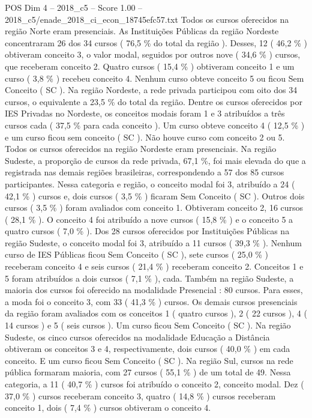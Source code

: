 \begin{textsample}{POS Dim 4 – 2018\_c5 – Score 1.00 – 2018\_c5/enade\_2018\_ci\_econ\_18745efc57.txt}
Todos os cursos oferecidos na região Norte eram presenciais.
As Instituições Públicas da região Nordeste concentraram 26 dos 34 cursos ( 76,5 \% do total da região ).
Desses, 12 ( 46,2 \% ) obtiveram conceito 3, o valor modal, seguidos por outros nove ( 34,6 \% ) cursos, que receberam conceito 2.
Quatro cursos ( 15,4 \% ) obtiveram conceito 1 e um curso ( 3,8 \% ) recebeu conceito 4.
Nenhum curso obteve conceito 5 ou ficou Sem Conceito ( SC ).
Na região Nordeste, a rede privada participou com oito dos 34 cursos, o equivalente a 23,5 \% do total da região.
Dentre os cursos oferecidos por IES Privadas no Nordeste, os conceitos modais foram 1 e 3 atribuídos a três cursos cada ( 37,5 \% para cada conceito ).
Um curso obteve conceito 4 ( 12,5 \% ) e um curso ficou sem conceito ( SC ).
Não houve curso com conceito 2 ou 5.
Todos os cursos oferecidos na região Nordeste eram presenciais.
Na região Sudeste, a proporção de cursos da rede privada, 67,1 \%, foi mais elevada do que a registrada nas demais regiões brasileiras, correspondendo a 57 dos 85 cursos participantes.
Nessa categoria e região, o conceito modal foi 3, atribuído a 24 ( 42,1 \% ) cursos e, dois cursos ( 3,5 \% ) ficaram Sem Conceito ( SC ).
Outros dois cursos ( 3,5 \% ) foram avaliados com conceito 1.
Obtiveram conceito 2, 16 cursos ( 28,1 \% ).
O conceito 4 foi atribuído a nove cursos ( 15,8 \% ) e o conceito 5 a quatro cursos ( 7,0 \% ).
Dos 28 cursos oferecidos por Instituições Públicas na região Sudeste, o conceito modal foi 3, atribuído a 11 cursos ( 39,3 \% ).
Nenhum curso de IES Públicas ficou Sem Conceito ( SC ), sete cursos ( 25,0 \% ) receberam conceito 4 e seis cursos ( 21,4 \% ) receberam conceito 2.
Conceitos 1 e 5 foram atribuídos a dois cursos ( 7,1 \% ), cada.
Também na região Sudeste, a maioria dos cursos foi oferecido na modalidade Presencial : 80 cursos.
Para esses, a moda foi o conceito 3, com 33 ( 41,3 \% ) cursos.
Os demais cursos presenciais da região foram avaliados com os conceitos 1 ( quatro cursos ), 2 ( 22 cursos ), 4 ( 14 cursos ) e 5 ( seis cursos ).
Um curso ficou Sem Conceito ( SC ).
Na região Sudeste, os cinco cursos oferecidos na modalidade Educação a Distância obtiveram os conceitos 3 e 4, respectivamente, dois cursos ( 40,0 \% ) em cada conceito.
E um curso ficou Sem Conceito ( SC ).
Na região Sul, cursos na rede pública formaram maioria, com 27 cursos ( 55,1 \% ) de um total de 49.
Nessa categoria, a 11 ( 40,7 \% ) cursos foi atribuído o conceito 2, conceito modal.
Dez ( 37,0 \% ) cursos receberam conceito 3, quatro ( 14,8 \% ) cursos receberam conceito 1, dois ( 7,4 \% ) cursos obtiveram o conceito 4.

\end{textsample}
